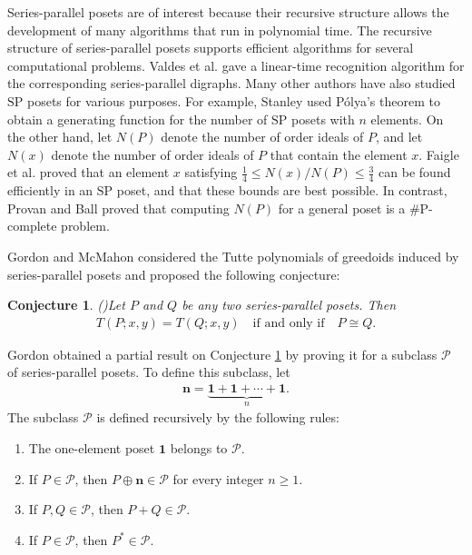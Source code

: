 \documentclass[10pt,a4paper]{amsart}
\newtheorem{conjecture}[theorem]{Conjecture}
\begin{document}
Series-parallel posets are of interest because their recursive structure
allows the development of many algorithms that run in polynomial time.
The recursive structure of series-parallel posets supports
efficient algorithms for several computational problems.
Valdes et al. \cite{Valdes1981} gave a linear-time recognition
algorithm for the corresponding series-parallel digraphs.
Many other authors have also studied $\mathrm{SP}$ posets
for various purposes.
For example, Stanley \cite{Stanley1974} used P\'olya's theorem
to obtain a generating function for the number of $\mathrm{SP}$ posets
with $n$ elements.
On the other hand, let $N(P)$ denote the number of order ideals of $P$,
and let $N(x)$ denote the number of order ideals of $P$ that contain
the element $x$.
Faigle et al. \cite{Faigle1986} proved that an element $x$
satisfying $\frac14\leq N(x)/N(P)\leq\frac34$ can be found
efficiently in an $\mathrm{SP}$ poset, and that these bounds
are best possible. In contrast, Provan and Ball \cite{Provan1983} proved that
computing $N(P)$ for a general poset is a $\#\mathrm P$-complete problem.

Gordon and McMahon \cite{GordonMcMahon2022} considered the Tutte
polynomials of greedoids induced by series-parallel posets
and proposed the following conjecture:

\begin{conjecture}(\cite{GordonMcMahon2022})\label{conj:reconstruction}
Let $P$ and $Q$ be any two series-parallel posets. Then
\begin{eqnarray*}\label{eq:conj}
T(P;x,y)=T(Q;x,y)\quad\text{if and only if}\quad P\cong Q.
\end{eqnarray*}
\end{conjecture}

Gordon \cite{Gordon1996} obtained a partial result on
Conjecture \ref{conj:reconstruction} by proving it for a subclass
$\mathcal{P}$ of series-parallel posets.
To define this subclass, let
\begin{eqnarray*}
\mathbf{n}=\underbrace{\mathbf{1}+\mathbf{1}+\cdots+\mathbf{1}}_{n}.
\end{eqnarray*}
The subclass $\mathcal{P}$ is defined recursively by the following rules:
\begin{enumerate}
    \item[\textup{(i)}] The one-element poset $\mathbf{1}$
    belongs to $\mathcal{P}$.
    \item[\textup{(ii)}] If $P\in\mathcal{P}$, then
    $P\oplus\mathbf{n}\in\mathcal{P}$ for every integer $n\geq 1$.
    \item[\textup{(iii)}] If $P,Q\in\mathcal{P}$, then
    $P+Q\in\mathcal{P}$.
    \item[\textup{(iv)}] If $P\in\mathcal{P}$, then
    $P^*\in\mathcal{P}$.
\end{enumerate}
\end{document}
